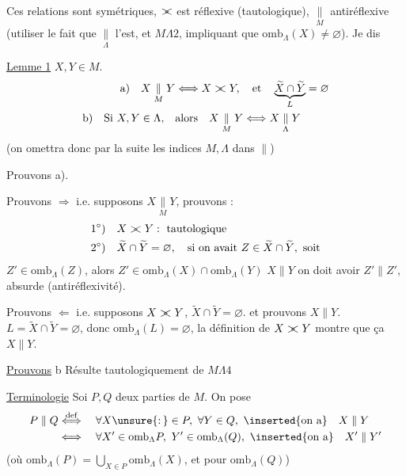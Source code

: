 
Ces relations sont symétriques,  $\mathrel{\rlap{$>$}<}$ est réflexive (tautologique), $\underset{M}{\parallel}$ antiréflexive (utiliser le fait que $\underset{\Lambda}{\parallel}$ l'est, et $M\Lambda2$, impliquant que $\mathrm{omb}_{\Lambda}(X)\ne\varnothing$). Je dis

\uline{Lemme 1}  $X,Y\in M$.
\[
\begin{aligned}
\text{a)}\quad X\underset{M}{\parallel}Y &\Longleftrightarrow X\mathrel{\rlap{$>$}<} Y,\quad\text{et}\quad \underbrace{\widetilde X\cap\widetilde Y}_{L}=\varnothing\\
\text{b)}\quad\text{Si } X,Y\in\Lambda,\quad&\text{alors}\quad X\underset{M}{\parallel}Y\Longleftrightarrow X\underset{\Lambda}{\parallel}Y
\end{aligned}
\]
(on omettra donc par la suite les indices $M,\Lambda$ dans $\parallel$)

Prouvons a). 

Prouvons $\Longrightarrow$ i.e. supposons $X\underset{M}{\parallel}Y$, prouvons :
\[
\begin{aligned}
1^{\circ})\quad &X\mathrel{\rlap{$>$}<} Y:\ \text{tautologique}\\
2^{\circ})\quad &\widetilde X\cap\widetilde Y=\varnothing,\quad\text{si on avait }Z\in\widetilde X\cap\widetilde Y,\ \text{soit}
\end{aligned}
\]
$Z'\in\mathrm{omb}_{\Lambda}(Z)$, alors $Z'\in\mathrm{omb}_{\Lambda}(X)\cap\mathrm{omb}_{\Lambda}(Y)$  $X\parallel Y$ on doit avoir $Z'\parallel Z'$, absurde (antiréflexivité).

Prouvons $\Longleftarrow$ i.e. supposons $X\mathrel{\rlap{$>$}<} Y$, $\widetilde X\cap\widetilde Y=\varnothing$. et prouvons $X\parallel Y$.     $L=\widetilde X\cap\widetilde Y=\varnothing$,  donc $\mathrm{omb}_{\Lambda}(L)=\varnothing$,  la définition de $X\mathrel{\rlap{$>$}<} Y$ montre que ça  $X\parallel Y$.

\uline{Prouvons} b Résulte tautologiquement de $M\Lambda4$

\uline{Terminologie} Soi $P,Q$ deux parties de $M$. On pose
\[
\begin{aligned}
P\parallel Q&\overset{\mathrm{def}}{\Longleftrightarrow}\quad\forall X\unsure{\mathpunct{:}}\in P,\ \forall Y\in Q,\ \text{\inserted{on a}}\quad X\parallel Y\\
&\Longleftrightarrow\quad\forall X'\in\mathrm{omb}_{\Lambda}P,\ Y'\in\mathrm{omb}_{\Lambda}(Q),\ \text{\inserted{on a}}\quad X'\parallel Y'
\end{aligned}
\]
(où $\mathrm{omb}_{\Lambda}(P)=\bigcup_{X\in P}\mathrm{omb}_{\Lambda}(X)$, et  pour $\mathrm{omb}_{\Lambda}(Q)$)
